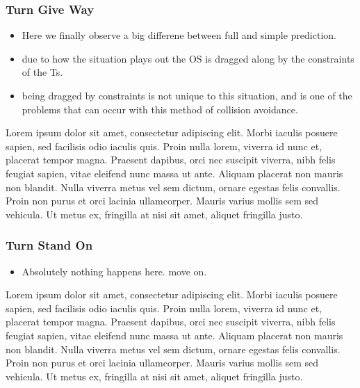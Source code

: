 \subsubsection{Turn Give Way}
\begin{itemize}
    \item Here we finally observe a big differene between full and simple prediction.
    \item due to how the situation plays out the \gls{OS} is dragged along by the constraints of the \gls{Ts}.
    \item being dragged by constraints is not unique to this situation, and is one of the problems that can occur
    with this method of collision avoidance.
\end{itemize}
Lorem ipsum dolor sit amet, consectetur adipiscing elit. Morbi iaculis posuere sapien, sed facilisis odio iaculis quis. 
Proin nulla lorem, viverra id nunc et, placerat tempor magna. Praesent dapibus, orci nec suscipit viverra, nibh felis feugiat sapien, 
vitae eleifend nunc massa ut ante. Aliquam placerat non mauris non blandit. Nulla viverra metus vel sem dictum, ornare egestas felis convallis. 
Proin non purus et orci lacinia ullamcorper. Mauris varius mollis sem sed vehicula. Ut metus ex, fringilla at nisi sit amet, aliquet fringilla justo.
\subsubsection{Turn Stand On}
\begin{itemize}
    \item Absolutely nothing happens here. move on.
\end{itemize}
Lorem ipsum dolor sit amet, consectetur adipiscing elit. Morbi iaculis posuere sapien, sed facilisis odio iaculis quis. 
Proin nulla lorem, viverra id nunc et, placerat tempor magna. Praesent dapibus, orci nec suscipit viverra, nibh felis feugiat sapien, 
vitae eleifend nunc massa ut ante. Aliquam placerat non mauris non blandit. Nulla viverra metus vel sem dictum, ornare egestas felis convallis. 
Proin non purus et orci lacinia ullamcorper. Mauris varius mollis sem sed vehicula. Ut metus ex, fringilla at nisi sit amet, aliquet fringilla justo.


